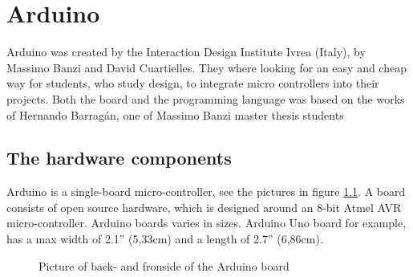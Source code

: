 \chapter{Arduino}\label{analysis:arduino}
Arduino was created by the Interaction Design Institute Ivrea (Italy), by Massimo Banzi and David Cuartielles. They where looking for an easy and cheap way for students, who study design, to integrate micro controllers into their projects\cite{arduino:hist}. Both the board and the programming language was based on the works of Hernando Barragán, one of Massimo Banzi master thesis students \cite{Wiring:thesis}

\section{The hardware components}
Arduino is a single-board micro-controller, see the pictures in figure \ref{fig:Arduino}.
A board consists of open source hardware, which is designed around an 8-bit Atmel AVR micro-controller. Arduino boards varies in sizes. Arduino Uno board for example, has a max width of 2.1'' (5,33cm) and a length of 2.7'' (6,86cm).  \\

\par
{}
\hfill
{}
\begin{figure}[H]
\caption{Picture of back- and fronside of the Arduino board \cite{Arduino_board_pics}}
\label{fig:Arduino}
\end{figure}
\par

